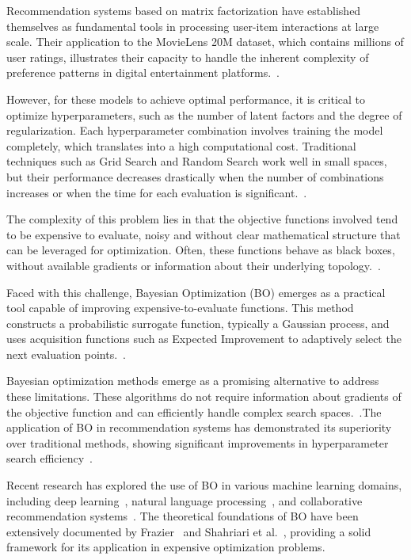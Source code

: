 \documentclass[conference]{IEEEtran}
\begin{document}
Recommendation systems based on matrix factorization have established themselves as fundamental tools in processing user-item interactions at large scale. Their application to the MovieLens 20M dataset, which contains millions of user ratings, illustrates their capacity to handle the inherent complexity of preference patterns in digital entertainment platforms.~\cite{harper2015movielens}.

However, for these models to achieve optimal performance, it is critical to optimize hyperparameters, such as the number of latent factors and the degree of regularization. Each hyperparameter combination involves training the model completely, which translates into a high computational cost. Traditional techniques such as Grid Search and Random Search work well in small spaces, but their performance decreases drastically when the number of combinations increases or when the time for each evaluation is significant.~\cite{bergstra2012random}.

The complexity of this problem lies in that the objective functions involved tend to be expensive to evaluate, noisy and without clear mathematical structure that can be leveraged for optimization. Often, these functions behave as black boxes, without available gradients or information about their underlying topology.~\cite{jones1998efficient}.

Faced with this challenge, Bayesian Optimization (BO) emerges as a practical tool capable of improving expensive-to-evaluate functions. This method constructs a probabilistic surrogate function, typically a Gaussian process, and uses acquisition functions such as Expected Improvement to adaptively select the next evaluation points.~\cite{snoek2012practical}.

Bayesian optimization methods emerge as a promising alternative to address these limitations. These algorithms do not require information about gradients of the objective function and can efficiently handle complex search spaces.~\cite{mockus1978application}.The application of BO in recommendation systems has demonstrated its superiority over traditional methods, showing significant improvements in hyperparameter search efficiency~\cite{galuzzi2020hyperparameter}.

Recent research has explored the use of BO in various machine learning domains, including deep learning~\cite{klein2017fast}, natural language processing~\cite{turner2021bayesian}, and collaborative recommendation systems~\cite{luo2016automatic}. The theoretical foundations of BO have been extensively documented by Frazier~\cite{frazier2018tutorial} and Shahriari et al.~\cite{shahriari2016taking}, providing a solid framework for its application in expensive optimization problems.
\end{document}
